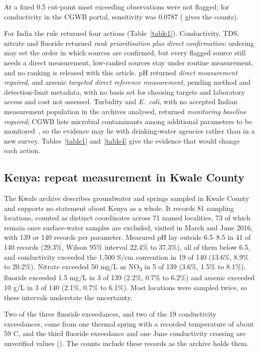 \documentclass[10pt,letterpaper]{article}
\begin{document}
At a fixed 0.5 cut-point most exceeding observations were not flagged; for conductivity in the CGWB portal, sensitivity was 0.0787 ( gives the counts).

For India the rule returned four actions (Table~\ref{table1}). Conductivity, TDS, nitrate and fluoride returned \textit{rank prioritisation plus direct confirmation}: ordering may set the order in which sources are confirmed, but every flagged source still needs a direct measurement, low-ranked sources stay under routine measurement, and no ranking is released with this article. pH returned \textit{direct measurement required}, and arsenic \textit{targeted direct reference measurement}, pending method and detection-limit metadata, with no basis set for choosing targets and laboratory access and cost not assessed. Turbidity and \textit{E.~coli}, with no accepted Indian measurement population in the archives analysed, returned \textit{monitoring baseline required}; CGWB lists microbial contaminants among additional parameters to be monitored~\cite{CGWB-SOP-GWQDataAnalysis}, so the evidence may lie with drinking-water agencies rather than in a new survey. Tables~\ref{table1} and~\ref{table4} give the evidence that would change each action.

\subsection*{Kenya: repeat measurement in Kwale County}

The Kwale archive describes groundwater and springs sampled in Kwale County and supports no statement about Kenya as a whole. It records 81 sampling locations, counted as distinct coordinates across 71 named localities, 73 of which remain once surface-water samples are excluded, visited in March and June 2016, with 139 or 140 records per parameter. Measured pH lay outside 6.5--8.5 in 41 of 140 records (29.3\%, Wilson 95\% interval 22.4\% to 37.3\%), all of them below 6.5, and conductivity exceeded the 1,500 \textmu{}S/cm convention in 19 of 140 (13.6\%, 8.9\% to 20.2\%). Nitrate exceeded 50 mg/L as NO\textsubscript{3} in 5 of 139 (3.6\%, 1.5\% to 8.1\%), fluoride exceeded 1.5 mg/L in 3 of 139 (2.2\%, 0.7\% to 6.2\%) and arsenic exceeded 10 \textmu{}g/L in 3 of 140 (2.1\%, 0.7\% to 6.1\%). Most locations were sampled twice, so these intervals understate the uncertainty.

Two of the three fluoride exceedances, and two of the 19 conductivity exceedances, come from one thermal spring with a recorded temperature of about 59 \textdegree{}C, and the third fluoride exceedance and one June conductivity crossing are unverified values (). The counts include these records as the archive holds them.
\end{document}
